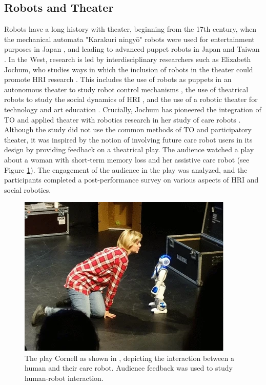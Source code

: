 \documentclass[dissertation,math,vertlayout,pdfa,colorlinks,nologo]{aaltoseries}
\begin{document}
\subsection{Robots and Theater}
Robots have a long history with theater, beginning from the 17th century, when the mechanical automata "Karakuri ningyō" robots were used for entertainment purposes in Japan \cite{knightEightLessonsLearned2011}, and leading to advanced puppet robots in Japan \cite{sakashitaYouPuppetEvaluation2017, kawaharaTransformedHumanPresence2016} and Taiwan \cite{huGlovePuppetRobot2008}. In the West, research is led by interdisciplinary researchers such as Elizabeth Jochum, who studies ways in which the inclusion of robots in the theater could promote HRI research \cite{jochumRehearsalRobotRevolution2014}. This includes the use of robots as puppets in an autonomous theater to study robot control mechanisms \cite{jochumRoboticPuppetsEngineering2014}, the use of theatrical robots to study the social dynamics of HRI \cite{katevasRobotComedyLab2015}, and the use of a robotic theater for technology and art education \cite{bravosanchezInteractiveDramaRobots2017,dongChildRobotMusicalTheater2024}. Crucially, Jochum has pioneered the integration of TO and applied theater with robotics research in her study of care robots \cite{jochumUsingTheatreStudy2016}. Although the study did not use the common methods of TO and participatory theater, it was inspired by the notion of involving future care robot users in its design by providing feedback on a theatrical play. The audience watched a play about a woman with short-term memory loss and her assistive care robot (see Figure \ref{fig:cornell}). The engagement of the audience in the play was analyzed, and the participants completed a post-performance survey on various aspects of HRI and social robotics.

\begin{figure}
    \centering
    \includegraphics[width=0.7\linewidth]{jochum.png}
    \caption{The play Cornell as shown in \cite{jochumUsingTheatreStudy2016}, depicting the interaction between a human and their care robot. Audience feedback was used to study human-robot interaction.}
    \label{fig:cornell}
\end{figure}
\end{document}

